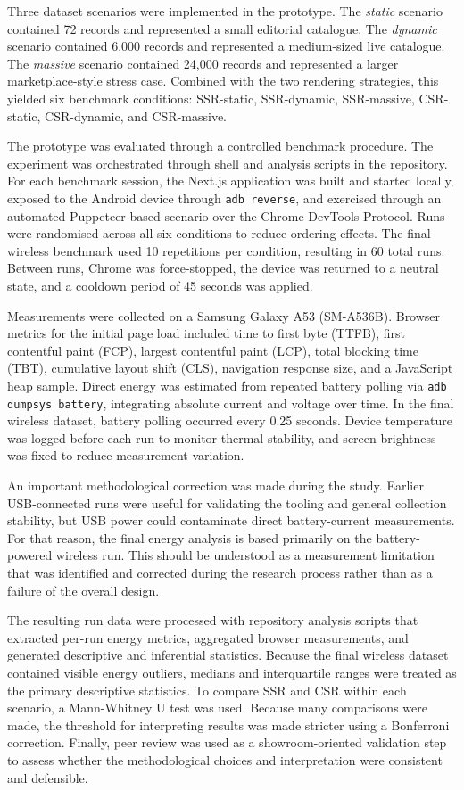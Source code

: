 Three dataset scenarios were implemented in the prototype. The \textit{static} scenario contained 72 records and represented a small editorial catalogue. The \textit{dynamic} scenario contained 6{,}000 records and represented a medium-sized live catalogue. The \textit{massive} scenario contained 24{,}000 records and represented a larger marketplace-style stress case. Combined with the two rendering strategies, this yielded six benchmark conditions: SSR-static, SSR-dynamic, SSR-massive, CSR-static, CSR-dynamic, and CSR-massive.

The prototype was evaluated through a controlled benchmark procedure. The experiment was orchestrated through shell and analysis scripts in the repository. For each benchmark session, the Next.js application was built and started locally, exposed to the Android device through \texttt{adb reverse}, and exercised through an automated Puppeteer-based scenario over the Chrome DevTools Protocol. Runs were randomised across all six conditions to reduce ordering effects. The final wireless benchmark used 10 repetitions per condition, resulting in 60 total runs. Between runs, Chrome was force-stopped, the device was returned to a neutral state, and a cooldown period of 45 seconds was applied.

Measurements were collected on a Samsung Galaxy A53 (SM-A536B). Browser metrics for the initial page load included time to first byte (TTFB), first contentful paint (FCP), largest contentful paint (LCP), total blocking time (TBT), cumulative layout shift (CLS), navigation response size, and a JavaScript heap sample. Direct energy was estimated from repeated battery polling via \texttt{adb dumpsys battery}, integrating absolute current and voltage over time. In the final wireless dataset, battery polling occurred every 0.25 seconds. Device temperature was logged before each run to monitor thermal stability, and screen brightness was fixed to reduce measurement variation.

An important methodological correction was made during the study. Earlier USB-connected runs were useful for validating the tooling and general collection stability, but USB power could contaminate direct battery-current measurements. For that reason, the final energy analysis is based primarily on the battery-powered wireless run. This should be understood as a measurement limitation that was identified and corrected during the research process rather than as a failure of the overall design.

The resulting run data were processed with repository analysis scripts that extracted per-run energy metrics, aggregated browser measurements, and generated descriptive and inferential statistics. Because the final wireless dataset contained visible energy outliers, medians and interquartile ranges were treated as the primary descriptive statistics. To compare SSR and CSR within each scenario, a Mann-Whitney U test was used. Because many comparisons were made, the threshold for interpreting results was made stricter using a Bonferroni correction. Finally, peer review was used as a showroom-oriented validation step to assess whether the methodological choices and interpretation were consistent and defensible.

